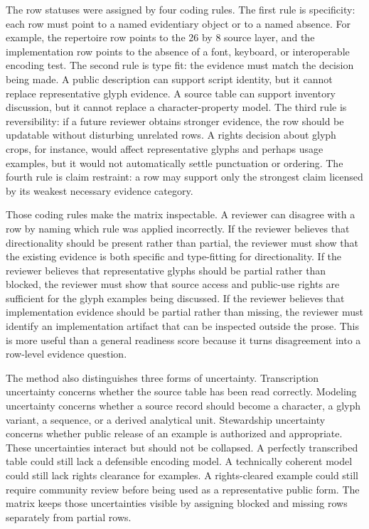 \documentclass[sigconf,nonacm]{acmart}
\begin{document}
The row statuses were assigned by four coding rules. The first rule is
specificity: each row must point to a named evidentiary object or to a named
absence. For example, the repertoire row points to the 26 by 8 source layer, and
the implementation row points to the absence of a font, keyboard, or
interoperable encoding test. The second rule is type fit: the evidence must
match the decision being made. A public description can support script identity,
but it cannot replace representative glyph evidence. A source table can support
inventory discussion, but it cannot replace a character-property model. The
third rule is reversibility: if a future reviewer obtains stronger evidence,
the row should be updatable without disturbing unrelated rows. A rights decision
about glyph crops, for instance, would affect representative glyphs and perhaps
usage examples, but it would not automatically settle punctuation or ordering.
The fourth rule is claim restraint: a row may support only the strongest claim
licensed by its weakest necessary evidence category.

Those coding rules make the matrix inspectable. A reviewer can disagree with a
row by naming which rule was applied incorrectly. If the reviewer believes that
directionality should be present rather than partial, the reviewer must show
that the existing evidence is both specific and type-fitting for directionality.
If the reviewer believes that representative glyphs should be partial rather
than blocked, the reviewer must show that source access and public-use rights
are sufficient for the glyph examples being discussed. If the reviewer believes
that implementation evidence should be partial rather than missing, the
reviewer must identify an implementation artifact that can be inspected outside
the prose. This is more useful than a general readiness score because it turns
disagreement into a row-level evidence question.

The method also distinguishes three forms of uncertainty. Transcription
uncertainty concerns whether the source table has been read correctly. Modeling
uncertainty concerns whether a source record should become a character, a glyph
variant, a sequence, or a derived analytical unit. Stewardship uncertainty
concerns whether public release of an example is authorized and appropriate.
These uncertainties interact but should not be collapsed. A perfectly
transcribed table could still lack a defensible encoding model. A technically
coherent model could still lack rights clearance for examples. A rights-cleared
example could still require community review before being used as a
representative public form. The matrix keeps those uncertainties visible by
assigning blocked and missing rows separately from partial rows.
\end{document}
